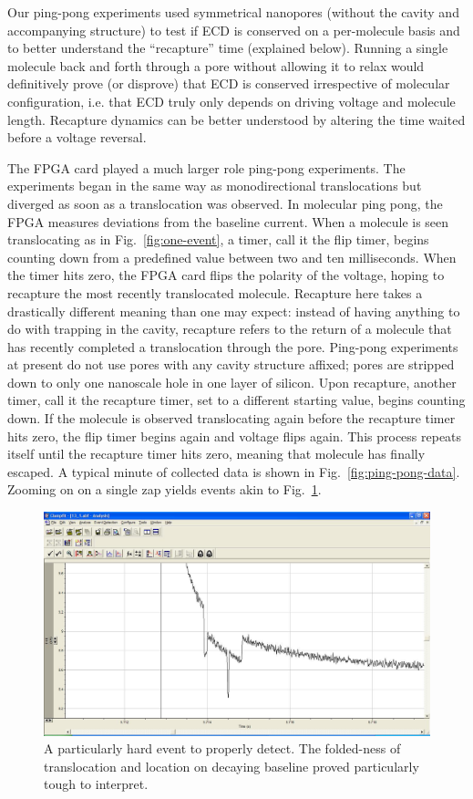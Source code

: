 \documentclass[aps,prl,preprint,groupedaddress]{revtex4}
\begin{document}
Our ping-pong experiments used symmetrical nanopores (without the cavity and accompanying structure) to test if ECD is conserved on a per-molecule basis and to better understand the ``recapture'' time (explained below).
Running a single molecule back and forth through a pore without allowing it to relax would definitively prove (or disprove) that ECD is conserved irrespective of molecular configuration, i.e. that ECD truly only depends on driving voltage and molecule length. Recapture dynamics can be better understood by altering the time waited before a voltage reversal.

The FPGA card played a much larger role ping-pong experiments.
The experiments began in the same way as monodirectional translocations but diverged as soon as a translocation was observed.
In molecular ping pong, the FPGA measures deviations from the baseline current.
When a molecule is seen translocating as in Fig.~\ref{fig:one-event}, a timer, call it the flip timer, begins counting down from a predefined value between two and ten milliseconds.
When the timer hits zero, the FPGA card flips the polarity of the voltage, hoping to recapture the most recently translocated molecule.
Recapture here takes a drastically different meaning than one may expect: instead of having anything to do with trapping in the cavity, recapture refers to the return of a molecule that has recently completed a translocation through the pore.
Ping-pong experiments at present do not use pores with any cavity structure affixed; pores are stripped down to only one nanoscale hole in one layer of silicon.
Upon recapture, another timer, call it the recapture timer, set to a different starting value, begins counting down.
If the molecule is observed translocating again before the recapture timer hits zero, the flip timer begins again and voltage flips again.
This process repeats itself until the recapture timer hits zero, meaning that molecule has finally escaped.
A typical minute of collected data is shown in Fig.~\ref{fig:ping-pong-data}.
Zooming on on a single zap yields events akin to Fig.~\ref{fig:tough-event}.

\begin{figure}[H]
\centering
\includegraphics[width=1\textwidth]{figures/tough-event}
\caption{A particularly hard event to properly detect.
The folded-ness of translocation and location on decaying baseline proved particularly tough to interpret.}
\label{fig:tough-event}
\end{figure}
\end{document}
